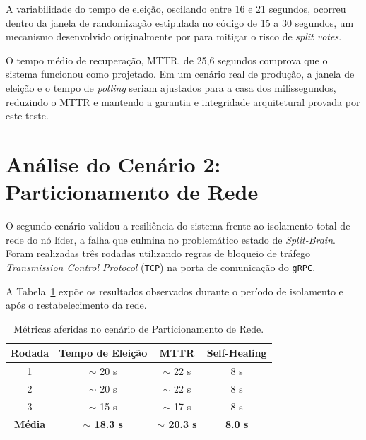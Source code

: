     A variabilidade do tempo de eleição, oscilando entre 16 e 21 segundos, ocorreu dentro da janela de randomização estipulada no código de 15 a 30 segundos, um mecanismo desenvolvido originalmente por  para mitigar o risco de \textit{split votes}. 
    
    O tempo médio de recuperação, MTTR, de 25,6 segundos comprova que o sistema funcionou como projetado. Em um cenário real de produção, a janela de eleição e o tempo de \textit{polling} seriam ajustados para a casa dos milissegundos, reduzindo o MTTR e mantendo a garantia e integridade arquitetural provada por este teste.
    
\section{Análise do Cenário 2: Particionamento de Rede}

    O segundo cenário validou a resiliência do sistema frente ao isolamento total de rede do nó líder, a falha que culmina no problemático estado de \textit{Split-Brain}. Foram realizadas três rodadas utilizando regras de bloqueio de tráfego \textit{Transmission Control Protocol} (\verb|TCP|) na porta de comunicação do \verb|gRPC|.

    A Tabela~\ref{tab:resultados_splitbrain} expõe os resultados observados durante o período de isolamento e após o restabelecimento da rede.

    \begin{table}[htb]
        \ABNTEXfontereduzida
        \centering
        \caption[Métricas do Particionamento de Rede]{Métricas aferidas no cenário de Particionamento de Rede.}
        \label{tab:resultados_splitbrain}
        \begin{tabular}{c|c|c|c}
            \textbf{Rodada} & \textbf{Tempo de Eleição} & \textbf{MTTR} & \textbf{Self-Healing} \\ \hline \hline
            1 & $\sim$ 20 s & $\sim$ 22 s & 8 s \\ \hline
            2 & $\sim$ 20 s & $\sim$ 22 s & 8 s \\ \hline
            3 & $\sim$ 15 s & $\sim$ 17 s & 8 s \\ \hline
            \textbf{Média} & \textbf{$\sim$ 18.3 s} & \textbf{$\sim$ 20.3 s} & \textbf{8.0 s} \\
        \end{tabular}
    \end{table}
    
